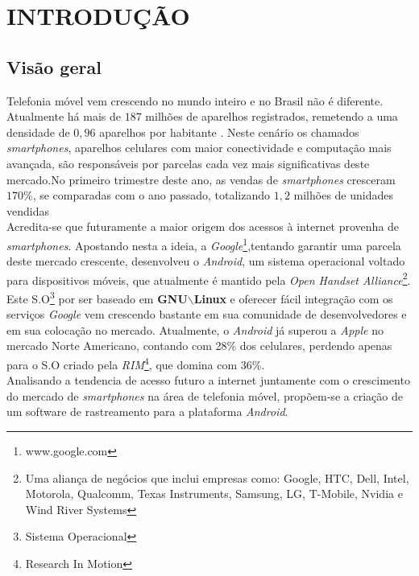 \chapter{INTRODUÇÃO}

\section{Visão geral}
Telefonia móvel vem crescendo no mundo inteiro e no Brasil não é diferente. Atualmente há mais de
$187$ milhões de aparelhos registrados, remetendo a uma densidade de $0,96$
aparelhos por habitante \cite{anatel}. Neste cenário os chamados \emph{smartphones}, aparelhos
celulares com maior conectividade e computação mais avançada, são responsáveis por parcelas cada vez
mais significativas deste mercado.No primeiro trimestre deste ano, as vendas de \emph{smartphones}
cresceram $170\%$, se comparadas com o ano passado, totalizando $1,2$ milhões de unidades
vendidas\cite{CorreioBraziliense}\\

Acredita-se que futuramente a maior origem dos acessos à internet provenha de \emph{smartphones}.
Apostando nesta a ideia, a \emph{Google}\footnote{www.google.com},tentando garantir uma parcela
deste mercado crescente, desenvolveu o \emph{Android}, um sistema operacional voltado para
dispositivos móveis, que atualmente é mantido pela \emph{Open Handset Alliance}\footnote{Uma
aliança de negócios que inclui empresas como: Google,
HTC, Dell, Intel, Motorola, Qualcomm, Texas Instruments, Samsung, LG, T-Mobile, Nvidia e Wind River
Systems}. Este S.O\footnote{Sistema Operacional} por ser baseado em \textbf{GNU$\backslash$Linux} e
oferecer fácil integração com os serviços \emph{Google} vem crescendo bastante em sua comunidade de
desenvolvedores e em sua colocação no mercado. Atualmente, o \emph{Android} já superou a
\emph{Apple} no mercado Norte Americano, contando com 28\% dos celulares, perdendo apenas para
o S.O criado pela \emph{RIM}\footnote{Research In Motion}, que domina com 36\%\cite{NPD-PressRelease}.\\

Analisando a tendencia de acesso futuro a internet juntamente com o crescimento do mercado de
\emph{smartphones} na área de telefonia móvel, propõem-se a criação de um software de rastreamento
para a plataforma \emph{Android}.\\ 

